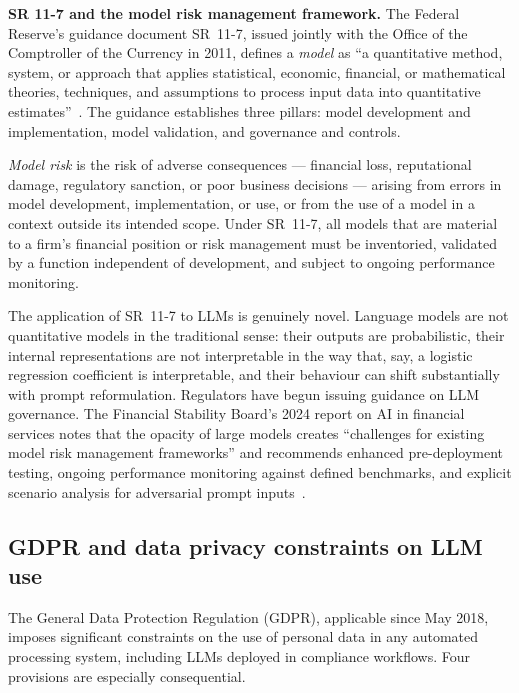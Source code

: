 \textbf{SR 11-7 and the model risk management framework.} The Federal Reserve's guidance document SR~11-7, issued jointly with the Office of the Comptroller of the Currency in 2011, defines a \emph{model} as ``a quantitative method, system, or approach that applies statistical, economic, financial, or mathematical theories, techniques, and assumptions to process input data into quantitative estimates''~\cite{sr117}. The guidance establishes three pillars: model development and implementation, model validation, and governance and controls.

\begin{definition}
\label{def:model-risk-sr117}
\emph{Model risk} is the risk of adverse consequences --- financial loss, reputational damage, regulatory sanction, or poor business decisions --- arising from errors in model development, implementation, or use, or from the use of a model in a context outside its intended scope. Under SR~11-7, all models that are material to a firm's financial position or risk management must be inventoried, validated by a function independent of development, and subject to ongoing performance monitoring.
\end{definition}

The application of SR~11-7 to LLMs is genuinely novel. Language models are not quantitative models in the traditional sense: their outputs are probabilistic, their internal representations are not interpretable in the way that, say, a logistic regression coefficient is interpretable, and their behaviour can shift substantially with prompt reformulation. Regulators have begun issuing guidance on LLM governance. The Financial Stability Board's 2024 report on AI in financial services notes that the opacity of large models creates ``challenges for existing model risk management frameworks'' and recommends enhanced pre-deployment testing, ongoing performance monitoring against defined benchmarks, and explicit scenario analysis for adversarial prompt inputs~\cite{FSB2024stability}.

\subsection{GDPR and data privacy constraints on LLM use}
\label{sec:ch11-gdpr-privacy}

The General Data Protection Regulation (GDPR), applicable since May 2018, imposes significant constraints on the use of personal data in any automated processing system, including LLMs deployed in compliance workflows. Four provisions are especially consequential.

